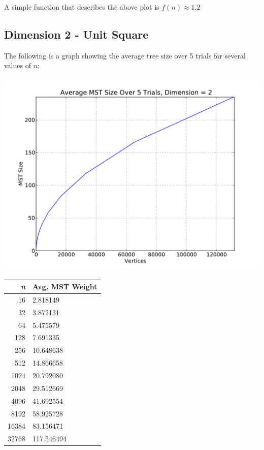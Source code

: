 \documentclass[solution, letterpaper]{cs121}
\begin{document}
A simple function that describes the above plot is $f(n) \approx 1.2$

\subsection*{Dimension 2 - Unit Square}

The following is a graph showing the average tree size over 5 trials for several values of $n$:
\begin{center}
\includegraphics[scale=0.6]{graphs/kruskals-dimension-2.pdf}
\begin{tabular}{ | r | l |}
\hline
\bf{\itshape{n}} & \bf{Avg. MST Weight} \\
\hline
16 & 2.818149 \\
\hline
32 & 3.872131 \\
\hline
64 & 5.475579 \\
\hline
128 & 7.691335 \\
\hline
256 & 10.648638 \\
\hline
512 & 14.866658 \\
\hline
1024 & 20.792080 \\
\hline
2048 & 29.512669 \\
\hline
4096 & 41.692554 \\
\hline
8192 & 58.925728 \\
\hline
16384 & 83.156471\\
\hline
32768 & 117.546494\\
\hline
\end{tabular}
\end{center}
\end{document}
